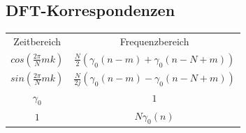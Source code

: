 \documentclass[10pt,a4paper]{article}
\begin{document}
\subsection{DFT-Korrespondenzen}
\begin{center}
  \bgroup
  \def\arraystretch{1.5}
  \begin{tabular}{ | c | c | }
  \cline{1-2}
          \rowcolor{black!15}
          Zeitbereich & Frequenzbereich \\
  
  \cline{1-2}
      $cos(\frac{2\pi}{N}mk)$ & $\frac{N}{2}(\gamma_0(n-m) + \gamma_0(n-N+m))$\\
  \cline{1-2}
      $sin(\frac{2\pi}{N}mk)$ & $\frac{N}{2j}(\gamma_0(n-m) - \gamma_0(n-N+m))$\\
  \cline{1-2}
        $\gamma_0$ & $1$ \\
  \cline{1-2}
        $1$ & $N\gamma_0(n)$ \\
  \cline{1-2}
\end{tabular}
\egroup
\end{center}
\end{document}
